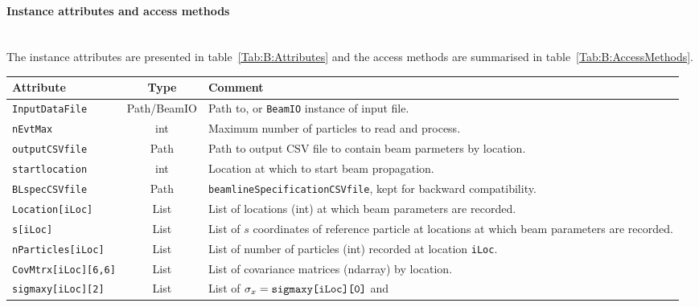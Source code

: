 \paragraph{Instance attributes and access methods}\mbox{}\\
\label{Para:B:InstAttr}
\noindent
The instance attributes are presented in table~\ref{Tab:B:Attributes}
and the access methods are summarised in table~\ref{Tab:B:AccessMethods}.
\begin{sidewaystable}[h]
  \caption{
    Definition of attributes of instances of the \texttt{Beam} class.
  }
  \label{Tab:B:Attributes}
  \begin{center}
    \begin{tabular}{|l|c|p{12cm}|}
      \hline
      \textbf{Attribute} & \textbf{Type} & \textbf{Comment}                                                          \\
      \hline
      \texttt{InputDataFile}      & Path/BeamIO & Path to, or \texttt{BeamIO} instance of input file.                \\
      \texttt{nEvtMax}            & int         & Maximum number of particles to read and process.                   \\
      \texttt{outputCSVfile}      & Path        & Path to output CSV file to contain beam parmeters by location.     \\
      \texttt{startlocation}      & int         & Location at which to start beam propagation.                       \\
      \texttt{BLspecCSVfile}      & Path        & \texttt{beamlineSpecificationCSVfile}, kept for backward compatibility. \\
      \texttt{Location[iLoc]}     & List        & List of locations (int) at which beam parameters are recorded.     \\
      \texttt{s[iLoc]}            & List        & List of $s$ coordinates of reference particle at locations at which
                                                  beam parameters are recorded.                                      \\
      \texttt{nParticles[iLoc]}   & List        & List of number of particles (int) recorded at location \texttt{iLoc}. \\
      \texttt{CovMtrx[iLoc][6,6]} & List        & List of covariance matrices (ndarray) by location.                 \\
      \texttt{sigmaxy[iLoc][2]}   & List        & List of $\sigma_x={\rm \texttt{sigmaxy[iLoc][0]}}$ and

\end{tabular}
\end{center}
\end{sidewaystable}
